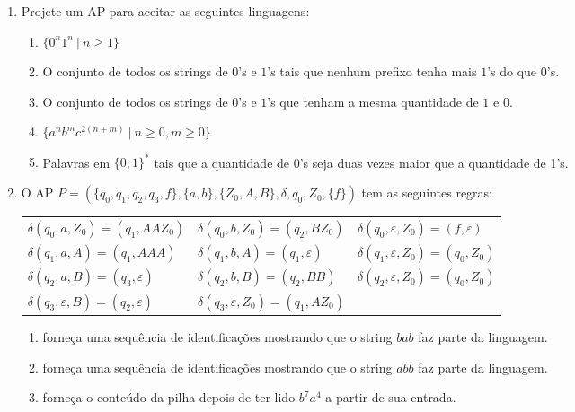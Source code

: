 \documentclass[12pt]{article}
\def\ve{\varepsilon}
\begin{document}
\begin{enumerate}



\item Projete um AP para aceitar as seguintes linguagens:

\begin{enumerate}

\item $\{0^n1^n~|~n\geq 1\}$

\item O conjunto de todos os strings de $0$'s e $1$'s tais que nenhum prefixo tenha mais $1$'s do que $0$'s.

\item O conjunto de todos os strings de $0$'s e $1$'s que tenham a mesma quantidade de $1$ e $0$.

\item $\{a^nb^mc^{2(n+m)}~|~n\geq 0, m\geq 0\}$

\item Palavras em $\{0,1\}^*$ tais que a quantidade de 0's seja duas vezes maior que a quantidade de 1's.

\end{enumerate}


\item O AP $P = (\{q_0,q_1,q_2,q_3,f\}, \{a,b\},\{Z_0,A,B\},\delta,q_0,Z_0,\{f\})$ tem as seguintes regras:\\
\begin{tabular}{lll}
$\delta(q_0, a, Z_0) = (q_1, AAZ_0)$ & $\delta(q_0, b, Z_0)   = (q_2, BZ_0)$ & $\delta(q_0, \ve, Z_0) = (f, \ve)$\\
$\delta(q_1, a, A)   = (q_1, AAA)$   & $\delta(q_1, b, A)     = (q_1, \ve)$  & $\delta(q_1, \ve, Z_0) = (q_0, Z_0)$\\
$\delta(q_2, a, B)   = (q_3, \ve)$   & $\delta(q_2, b, B)     = (q_2, BB)$   & $\delta(q_2, \ve, Z_0) = (q_0, Z_0)$\\
$\delta(q_3, \ve, B) = (q_2, \ve)$   & $\delta(q_3, \ve, Z_0) = (q_1, AZ_0)$ & 
\end{tabular}

\begin{enumerate}
  \item forneça uma sequência de identificações mostrando que o string $bab$ faz parte da linguagem.
  \item forneça uma sequência de identificações mostrando que o string $abb$ faz parte da linguagem.
  \item forneça o conteúdo da pilha depois de ter lido $b^7a^4$ a partir de sua entrada.
\end{enumerate}





\end{enumerate}
\end{document}
